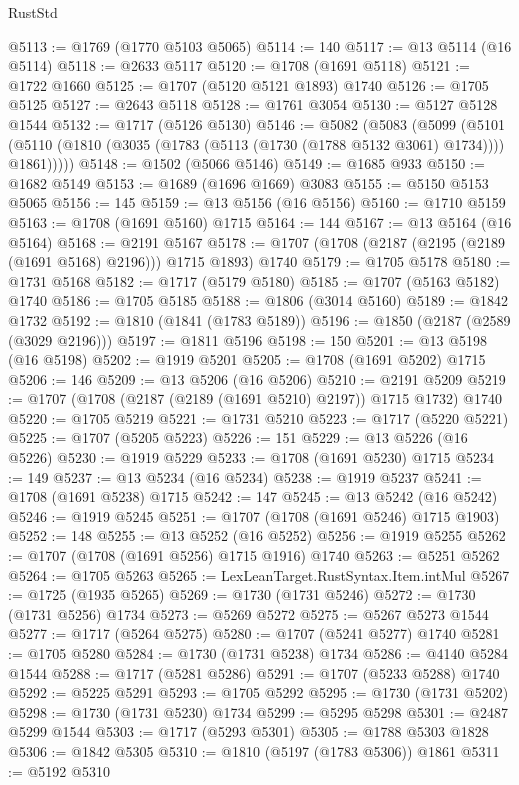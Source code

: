 \begin{lexlean}{RustStd}
\begin{coremodule}
@5113 := @1769 (@1770 @5103 @5065)
@5114 := 140
@5117 := @13 @5114 (@16 @5114)
@5118 := @2633 @5117
@5120 := @1708 (@1691 @5118)
@5121 := @1722 @1660
@5125 := @1707 (@5120 @5121 @1893) @1740
@5126 := @1705 @5125
@5127 := @2643 @5118
@5128 := @1761 @3054
@5130 := @5127 @5128 @1544
@5132 := @1717 (@5126 @5130)
@5146 := @5082
    (@5083
      (@5099
        (@5101 (@5110 (@1810 (@3035 (@1783 (@5113 (@1730 (@1788 @5132 @3061) @1734)))) @1861)))))
@5148 := @1502 (@5066 @5146)
@5149 := @1685 @933
@5150 := @1682 @5149
@5153 := @1689 (@1696 @1669) @3083
@5155 := @5150 @5153 @5065
@5156 := 145
@5159 := @13 @5156 (@16 @5156)
@5160 := @1710 @5159
@5163 := @1708 (@1691 @5160) @1715
@5164 := 144
@5167 := @13 @5164 (@16 @5164)
@5168 := @2191 @5167
@5178 := @1707 (@1708 (@2187 (@2195 (@2189 (@1691 @5168) @2196))) @1715 @1893) @1740
@5179 := @1705 @5178
@5180 := @1731 @5168
@5182 := @1717 (@5179 @5180)
@5185 := @1707 (@5163 @5182) @1740
@5186 := @1705 @5185
@5188 := @1806 (@3014 @5160)
@5189 := @1842 @1732
@5192 := @1810 (@1841 (@1783 @5189))
@5196 := @1850 (@2187 (@2589 (@3029 @2196)))
@5197 := @1811 @5196
@5198 := 150
@5201 := @13 @5198 (@16 @5198)
@5202 := @1919 @5201
@5205 := @1708 (@1691 @5202) @1715
@5206 := 146
@5209 := @13 @5206 (@16 @5206)
@5210 := @2191 @5209
@5219 := @1707 (@1708 (@2187 (@2189 (@1691 @5210) @2197)) @1715 @1732) @1740
@5220 := @1705 @5219
@5221 := @1731 @5210
@5223 := @1717 (@5220 @5221)
@5225 := @1707 (@5205 @5223)
@5226 := 151
@5229 := @13 @5226 (@16 @5226)
@5230 := @1919 @5229
@5233 := @1708 (@1691 @5230) @1715
@5234 := 149
@5237 := @13 @5234 (@16 @5234)
@5238 := @1919 @5237
@5241 := @1708 (@1691 @5238) @1715
@5242 := 147
@5245 := @13 @5242 (@16 @5242)
@5246 := @1919 @5245
@5251 := @1707 (@1708 (@1691 @5246) @1715 @1903)
@5252 := 148
@5255 := @13 @5252 (@16 @5252)
@5256 := @1919 @5255
@5262 := @1707 (@1708 (@1691 @5256) @1715 @1916) @1740
@5263 := @5251 @5262
@5264 := @1705 @5263
@5265 := LexLeanTarget.RustSyntax.Item.intMul
@5267 := @1725 (@1935 @5265)
@5269 := @1730 (@1731 @5246)
@5272 := @1730 (@1731 @5256) @1734
@5273 := @5269 @5272
@5275 := @5267 @5273 @1544
@5277 := @1717 (@5264 @5275)
@5280 := @1707 (@5241 @5277) @1740
@5281 := @1705 @5280
@5284 := @1730 (@1731 @5238) @1734
@5286 := @4140 @5284 @1544
@5288 := @1717 (@5281 @5286)
@5291 := @1707 (@5233 @5288) @1740
@5292 := @5225 @5291
@5293 := @1705 @5292
@5295 := @1730 (@1731 @5202)
@5298 := @1730 (@1731 @5230) @1734
@5299 := @5295 @5298
@5301 := @2487 @5299 @1544
@5303 := @1717 (@5293 @5301)
@5305 := @1788 @5303 @1828
@5306 := @1842 @5305
@5310 := @1810 (@5197 (@1783 @5306)) @1861
@5311 := @5192 @5310

\end{coremodule}
\end{lexlean}
